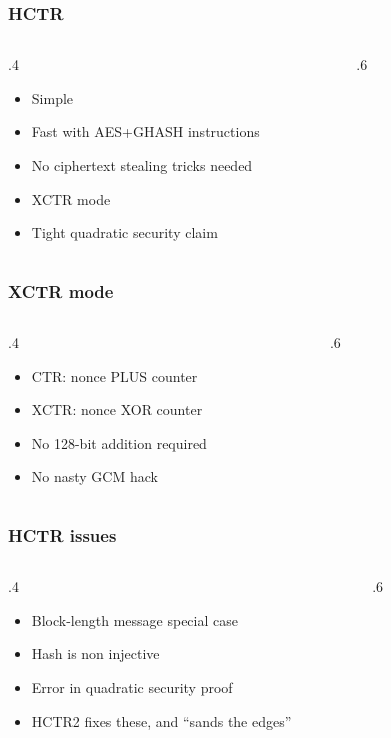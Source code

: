 \documentclass[aspectratio=169]{beamer}
\newenvironment*{figslide}{
    \begin{columns}
        \begin{column}{.4\textwidth}

}{
\end{column}
\begin{column}{.6\textwidth}
    \begin{figure}
        
    \end{figure}
\end{column}
\end{columns}
}
\begin{document}
\toggletrue{oldhctr}
\renewcommand*{\hdiag}{\hpoly}

\begin{frame}

\frametitle{HCTR}

    \begin{figslide}
        \begin{itemize}
            \item Simple
            \item Fast with AES+GHASH instructions
            \item No ciphertext stealing tricks needed
            \item XCTR mode
            \item Tight quadratic security claim
        \end{itemize}
    \end{figslide}
\end{frame}

\begin{frame}

    \frametitle{XCTR mode}
    
    \begin{figslide}
            \begin{itemize}
                \item CTR: nonce PLUS counter
                \item XCTR: nonce XOR counter
                \item No 128-bit addition required
                \item No nasty GCM hack
            \end{itemize}
    \end{figslide}
\end{frame}

\begin{frame}

\frametitle{HCTR issues}
\begin{figslide}
        \begin{itemize}
            \item Block-length message special case
            \item Hash is non injective
            \item Error in quadratic security proof
            \item HCTR2 fixes these, and ``sands the edges''
        \end{itemize}
\end{figslide}

\end{frame}
\end{document}
